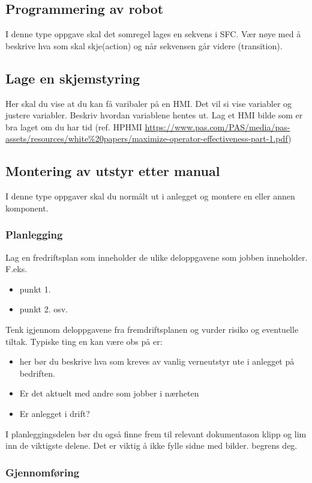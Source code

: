\subsection{Programmering av robot}
I denne type oppgave skal det somregel lages en sekvens i SFC. Vær nøye med å beskrive hva som skal skje(action) og når sekvensen går videre (transition). 
\subsection{Lage en skjemstyring}
Her skal du vise at du kan få varibaler på en HMI. Det vil si vise variabler og justere variabler. Beskriv hvordan variablene hentes ut. 
\vskip 5pt 
Lag et HMI bilde som er bra laget om du har tid (ref. HPHMI \url{https://www.pas.com/PAS/media/pas-assets/resources/white%20papers/maximize-operator-effectiveness-part-1.pdf})
\subsection{Montering av utstyr etter manual}
I denne type oppgaver skal du normålt ut i anlegget og montere en eller annen komponent. 
\subsubsection*{Planlegging}
Lag en fredriftsplan som inneholder de ulike deloppgavene  som jobben inneholder. 
F.eks. 
\begin{itemize}
	\item punkt 1. 
	\item punkt 2.  osv. 

\end{itemize}


Tenk igjennom deloppgavene fra fremdriftsplanen og vurder risiko og eventuelle tiltak. Typiske ting en kan være obs på er:
\begin{itemize}
	\item her bør du beskrive hva som kreves av vanlig verneutstyr ute i anlegget på bedriften.
	\item Er det aktuelt med andre som jobber i nærheten
	\item Er anlegget i drift?
\end{itemize}

\vskip 5pt 
I planleggingsdelen bør du  også finne frem til relevant dokumentason klipp og lim inn de viktigste delene. Det er viktig å ikke fylle sidne med bilder. begrens deg.  

\subsubsection*{Gjennomføring}

